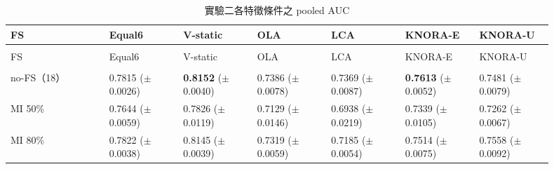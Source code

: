 \begingroup
\small{}\setlength{\tabcolsep}{3pt}
\setlength{\LTleft}{\fill}\setlength{\LTright}{\fill}
\begin{longtable}{@{}>{\raggedright\arraybackslash}p{0.16\linewidth}>{\raggedright\arraybackslash}p{0.123\linewidth}>{\raggedright\arraybackslash}p{0.123\linewidth}>{\raggedright\arraybackslash}p{0.123\linewidth}>{\raggedright\arraybackslash}p{0.123\linewidth}>{\raggedright\arraybackslash}p{0.123\linewidth}>{\raggedright\arraybackslash}p{0.123\linewidth}@{}}
\caption{實驗二各特徵條件之 pooled AUC}\label{tab:results-fs-auc}\\
\toprule
FS & Equal6 & V-static & OLA & LCA & KNORA-E & KNORA-U \\
\midrule\endfirsthead
\multicolumn{7}{c}{表~\thetable（續）}\\
\toprule
FS & Equal6 & V-static & OLA & LCA & KNORA-E & KNORA-U \\
\midrule\endhead
\midrule\multicolumn{7}{r}{續下頁}\\\endfoot
\bottomrule\endlastfoot
no-FS（18） & \shortstack[l]{0.7815\\{\scriptsize(\(\pm\)0.0026)}} & \shortstack[l]{\textbf{0.8152}\\{\scriptsize(\(\pm\)0.0040)}} & \shortstack[l]{0.7386\\{\scriptsize(\(\pm\)0.0078)}} & \shortstack[l]{0.7369\\{\scriptsize(\(\pm\)0.0087)}} & \shortstack[l]{\textbf{0.7613}\\{\scriptsize(\(\pm\)0.0052)}} & \shortstack[l]{0.7481\\{\scriptsize(\(\pm\)0.0079)}} \\
MI 50\% & \shortstack[l]{0.7644\\{\scriptsize(\(\pm\)0.0059)}} & \shortstack[l]{0.7826\\{\scriptsize(\(\pm\)0.0119)}} & \shortstack[l]{0.7129\\{\scriptsize(\(\pm\)0.0146)}} & \shortstack[l]{0.6938\\{\scriptsize(\(\pm\)0.0219)}} & \shortstack[l]{0.7339\\{\scriptsize(\(\pm\)0.0105)}} & \shortstack[l]{0.7262\\{\scriptsize(\(\pm\)0.0067)}} \\
MI 80\% & \shortstack[l]{0.7822\\{\scriptsize(\(\pm\)0.0038)}} & \shortstack[l]{0.8145\\{\scriptsize(\(\pm\)0.0039)}} & \shortstack[l]{0.7319\\{\scriptsize(\(\pm\)0.0059)}} & \shortstack[l]{0.7185\\{\scriptsize(\(\pm\)0.0054)}} & \shortstack[l]{0.7514\\{\scriptsize(\(\pm\)0.0075)}} & \shortstack[l]{0.7558\\{\scriptsize(\(\pm\)0.0092)}} \\

\end{longtable}

